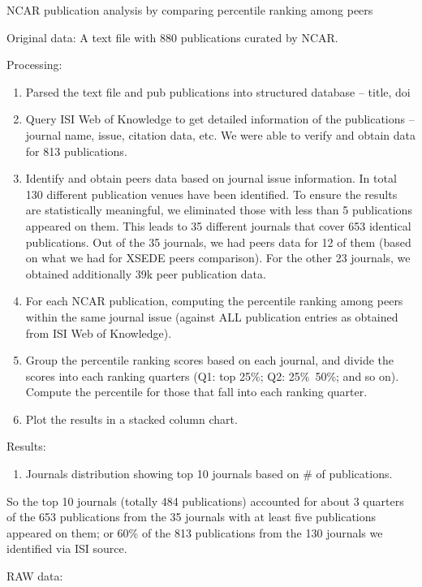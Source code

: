 \documentclass{sig-alternate}
\begin{document}
NCAR publication analysis by comparing percentile ranking among peers


Original data:
A text file with 880 publications curated by NCAR.

Processing:
\begin{enumerate}
\item	Parsed the text file and pub publications into structured database -- title, doi
\item	Query ISI Web of Knowledge to get detailed information of the publications -- journal name, issue, citation data, etc. We were able to verify and obtain data for 813 publications.
\item	Identify and obtain peers data based on journal issue information. In total 130 different publication venues have been identified. To ensure the results are statistically meaningful, we eliminated those with less than 5 publications appeared on them. This leads to 35 different journals that cover 653 identical publications. Out of the 35 journals, we had peers data for 12 of them (based on what we had for XSEDE peers comparison). For the other 23 journals, we obtained additionally 39k peer publication data.
\item	For each NCAR publication, computing the percentile ranking among peers within the same journal issue (against ALL publication entries as obtained from ISI Web of Knowledge).
\item	Group the percentile ranking scores based on each journal, and divide the scores into each ranking quarters (Q1: top 25\%; Q2: 25\%~50\%; and so on). Compute the percentile for those that fall into each ranking quarter.
\item	Plot the results in a stacked column chart.
\end{enumerate}

Results:
\begin{enumerate}
\item	Journals distribution showing top 10 journals based on \# of publications.
\end{enumerate}

So the top 10 journals (totally 484 publications) accounted for about 3 quarters of the 653 publications from the 35 journals with at least five publications appeared on them; or 60\% of the 813 publications from the 130 journals we identified via ISI source.

RAW data:
\end{document}
